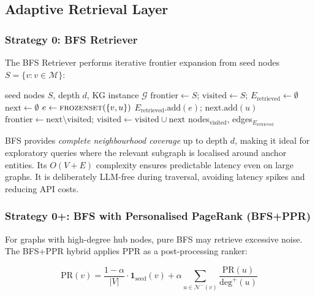 \documentclass[12pt,a4paper]{article}
\begin{document}
\subsection{Adaptive Retrieval Layer}

\subsubsection{Strategy 0: BFS Retriever}
\label{sec:bfs}

The BFS Retriever performs iterative frontier expansion from seed nodes
$S = \{v : v \in \mathcal{M}\}$:

\begin{algorithmbox}
\begin{algorithmic}[1]
\Require seed nodes $S$, depth $d$, KG instance $\mathcal{G}$
\State $\text{frontier} \leftarrow S$; $\text{visited} \leftarrow S$;
       $E_{\text{retrieved}} \leftarrow \emptyset$
  \State $\text{next} \leftarrow \emptyset$
      \State $e \leftarrow \textsc{frozenset}(\{v, u\})$
        \State $E_{\text{retrieved}}.\text{add}(e)$; $\text{next}.\text{add}(u)$
      \EndIf
    \EndFor
  \EndFor
  \State $\text{frontier} \leftarrow \text{next} \setminus \text{visited}$;
         $\text{visited} \leftarrow \text{visited} \cup \text{next}$
\EndFor
\Return nodes$_{\text{visited}}$, edges$_{E_{\text{retrieved}}}$
\end{algorithmic}
\end{algorithmbox}

BFS provides \emph{complete neighbourhood coverage} up to depth $d$, making
it ideal for exploratory queries where the relevant subgraph is localised around
anchor entities. Its $O(V + E)$ complexity ensures predictable latency even on
large graphs. It is deliberately LLM-free during traversal, avoiding latency
spikes and reducing API costs.

\subsubsection{Strategy 0+: BFS with Personalised PageRank (BFS+PPR)}

For graphs with high-degree hub nodes, pure BFS may retrieve excessive noise.
The BFS+PPR hybrid applies PPR as a post-processing ranker:

\begin{equation}
\text{PR}(v) = \frac{1-\alpha}{|V|} \cdot \mathbf{1}_{\text{seed}}(v)
  + \alpha \sum_{u \in \mathcal{N}^{-}(v)} \frac{\text{PR}(u)}{\text{deg}^+(u)}
\label{eq:ppr}
\end{equation}
\end{document}

